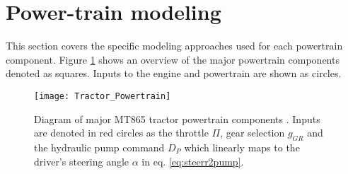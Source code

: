 \section{Power-train modeling}
This section covers the specific modeling approaches used for each powertrain component. Figure \ref{fig:Tractor_Powertrain} shows an overview of the major powertrain components denoted as squares. Inputs to the engine and powertrain are shown as circles.  
\begin{figure}[h]
    \centering
    \texttt{[image: Tractor\_Powertrain]}
    \caption{Diagram of major MT865 tractor powertrain components \cite{Caterpillar2002,alexander1987caterpillar}. Inputs are denoted in red circles as the throttle $\Pi$, gear selection $g_{GR}$ and the hydraulic pump command $D_P$ which linearly maps to the driver's steering angle $\alpha$ in eq. \ref{eq:steerr2pump}.}
    \label{fig:Tractor_Powertrain}
\end{figure}
